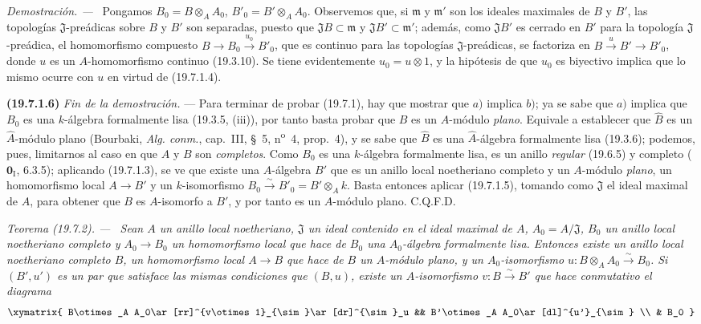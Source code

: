 \documentclass[10pt,oneside]{book}
\makeatletter
\newcommand{\setmanualcurrentlabel}[1]{\def\@currentlabel{#1}}
\newenvironment{theorem}[1][]{%
  \setmanualcurrentlabel{#1}\par\medskip\noindent\itshape Teorema (#1). ---\ }{\par}
\newenvironment{proof}{%
  \par\medskip\noindent\textit{Demostración. ---\ }}{\par}
\makeatother
\begin{document}
\begin{proof}
Pongamos $B_0=B\otimes_A A_0$, $B'_0=B'\otimes_A A_0$. Observemos que, si
$\mathfrak m$ y $\mathfrak m'$ son los ideales maximales de $B$ y $B'$, las
topologías $\mathfrak J$-preádicas sobre $B$ y $B'$ son separadas, puesto que
$\mathfrak JB\subset\mathfrak m$ y $\mathfrak JB'\subset\mathfrak m'$; además,
como $\mathfrak JB'$ es cerrado en $B'$ para la topología
$\mathfrak J$-preádica, el homomorfismo compuesto
$B\to B_0\xrightarrow{u_0}B'_0$, que es continuo para las topologías
$\mathfrak J$-preádicas, se factoriza en $B\xrightarrow{u}B'\to B'_0$, donde
$u$ es un $A$-homomorfismo continuo (19.3.10). Se tiene evidentemente
$u_0=u\otimes1$, y la hipótesis de que $u_0$ es biyectivo implica que lo mismo
ocurre con $u$ en virtud de (19.7.1.4).
\end{proof}

\medskip
\noindent\textbf{(19.7.1.6)}\enspace
\emph{Fin de la demostración.} --- Para terminar de probar (19.7.1), hay que
mostrar que $a)$ implica $b)$; ya se sabe que $a)$ implica que $B_0$ es
una $k$-álgebra formalmente lisa (19.3.5, (iii)), por tanto basta probar
que $B$ es un $A$-módulo \emph{plano}. Equivale a establecer que $\widehat B$
es un $\widehat A$-módulo plano (Bourbaki, \emph{Alg. conm.}, cap.~III, §~5,
n\textsuperscript{o}~4, prop.~4), y se sabe que $\widehat B$ es una
$\widehat A$-álgebra formalmente lisa (19.3.6); podemos, pues, limitarnos al
caso en que $A$ y $B$ son \emph{completos}. Como $B_0$ es una $k$-álgebra formalmente
lisa, es un anillo \emph{regular} (19.6.5) y completo
($\mathbf 0_{\mathrm I}$, 6.3.5); aplicando (19.7.1.3), se ve que existe
una $A$-álgebra $B'$ que es un anillo local noetheriano completo y un
$A$-módulo \emph{plano}, un homomorfismo local $A\to B'$ y un $k$-isomorfismo
$B_0\xrightarrow{\sim}B'_0=B'\otimes_A k$. Basta entonces aplicar (19.7.1.5),
tomando como $\mathfrak J$ el ideal maximal de $A$, para obtener que $B$ es
$A$-isomorfo a $B'$, y por tanto es un $A$-módulo plano. C.Q.F.D.

\begin{theorem}[19.7.2]
\label{0.19.7.2-es}
Sean $A$ un anillo local noetheriano, $\mathfrak J$ un ideal contenido en
el ideal maximal de $A$, $A_0=A/\mathfrak J$, $B_0$ un anillo local noetheriano
completo y $A_0\to B_0$ un homomorfismo local que hace de $B_0$ una
$A_0$-álgebra formalmente lisa. Entonces existe un anillo local noetheriano
completo $B$, un homomorfismo local $A\to B$ que hace de $B$ un $A$-módulo
\textup{plano}, y un $A_0$-isomorfismo
$u:B\otimes_A A_0\xrightarrow{\sim}B_0$. Si $(B',u')$ es un par
que satisface las mismas condiciones que $(B,u)$, existe un $A$-isomorfismo
$v:B\xrightarrow{\sim}B'$ que hace conmutativo el diagrama
\[
\xymatrix{
  B\otimes_A A_0\ar[rr]^{v\otimes1}_{\sim}\ar[dr]^{\sim}_u &&
  B'\otimes_A A_0\ar[dl]^{u'}_{\sim} \\
  & B_0
}
\]
\end{theorem}
\end{document}
